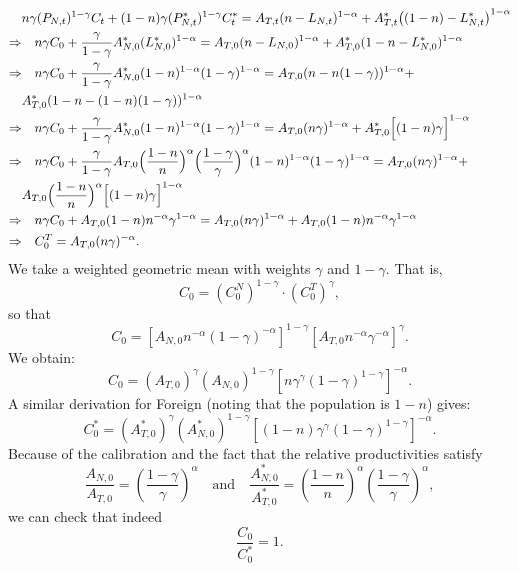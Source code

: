 \documentclass[a4paper,12pt]{article} %
\theoremstyle{nonitalic}
\begin{document}
\begin{align*}
    & n\gamma (P_{N,t})^{1-\gamma} C_t + (1-n)\gamma (P^*_{N,t})^{1-\gamma} C^*_t = A_{T,t} (n-L_{N,t})^{ 1-\alpha} + A^*_{T,t} \big((1-n)-L^*_{N,t}\big)^{ 1-\alpha} \\
    \Rightarrow & \quad n\gamma C_0 + \frac{\gamma}{1-\gamma} A_{N,0}^*(L_{N,0}^*)^{1-\alpha} = A_{T,0} (n - L_{N,0})^{1-\alpha} + A^*_{T,0} (1-n - L_{N,0}^*)^{1-\alpha} \\
    \Rightarrow & \quad n\gamma C_0 + \frac{\gamma}{1-\gamma} A_{N,0}^*(1-n)^{1-\alpha} (1-\gamma)^{1-\alpha} = A_{T,0} (n - n(1-\gamma))^{1-\alpha} + \\
    & A^*_{T,0} (1-n - (1-n)(1-\gamma))^{1-\alpha} \\
    \Rightarrow & \quad n\gamma C_0 + \frac{\gamma}{1-\gamma} A_{N,0}^*(1-n)^{1-\alpha} (1-\gamma)^{1-\alpha} = A_{T,0} (n\gamma)^{1-\alpha} + A^*_{T,0} \Bigl[(1-n)\gamma\Bigr]^{1-\alpha} \\
    \Rightarrow & \quad n\gamma C_0 + \frac{\gamma}{1-\gamma} A_{T,0} \Bigl(\frac{1-n}{n}\Bigr)^{\alpha} \Bigl(\frac{1-\gamma}{\gamma}\Bigr)^{\alpha} (1-n)^{1-\alpha} (1-\gamma)^{1-\alpha} = A_{T,0} (n\gamma)^{1-\alpha} + \\
    & A_{T,0} \Bigl(\frac{1-n}{n}\Bigr)^{\alpha} \Bigl[(1-n)\gamma\Bigr]^{1-\alpha} \\
    \Rightarrow & \quad n\gamma C_0 + A_{T,0}(1-n) n^{-\alpha} \gamma^{1-\alpha} = A_{T,0} (n\gamma)^{1-\alpha} + A_{T,0} (1-n) n^{-\alpha} \gamma^{1-\alpha} \\
    \Rightarrow & \quad C_0^T = A_{T,0} (n\gamma)^{-\alpha}.
\end{align*}
We take a weighted geometric mean with weights $\gamma$ and $1-\gamma$. That is,
\[
C_0 = (C_{0}^N)^{1-\gamma} \cdot (C_{0}^T)^{\gamma},
\]
so that
\[
C_0 = \left[A_{N,0}  n^{-\alpha}(1-\gamma)^{-\alpha}\right]^{1-\gamma}
\left[A_{T,0}  n^{-\alpha} \gamma^{-\alpha}\right]^{\gamma}.
\]
We obtain:
\[
C_0 = (A_{T,0})^{\gamma}(A_{N,0})^{1-\gamma}  \left[n \gamma^{\gamma}(1-\gamma)^{1-\gamma}\right]^{-\alpha}. \tag{6e}
\]
A similar derivation for Foreign (noting that the population is $1-n$) gives:
\[
C^*_0 = (A^*_{T,0})^{\gamma}(A^*_{N,0})^{1-\gamma} \left[(1-n)\gamma^{\gamma}(1-\gamma)^{1-\gamma}\right]^{-\alpha}. \tag{6f}
\]
Because of the calibration and the fact that the relative productivities satisfy
\[
\frac{A_{N,0}}{A_{T,0}} = \left(\frac{1-\gamma}{\gamma}\right)^{\alpha} \quad \text{and} \quad \frac{A^*_{N,0}}{A^*_{T,0}} = \left(\frac{1-n}{n}\right)^{\alpha}\left(\frac{1-\gamma}{\gamma}\right)^{\alpha},
\]
we can check that indeed
\[
\frac{C_0}{C^*_0}=1. \tag{6g}
\]
\end{document}
